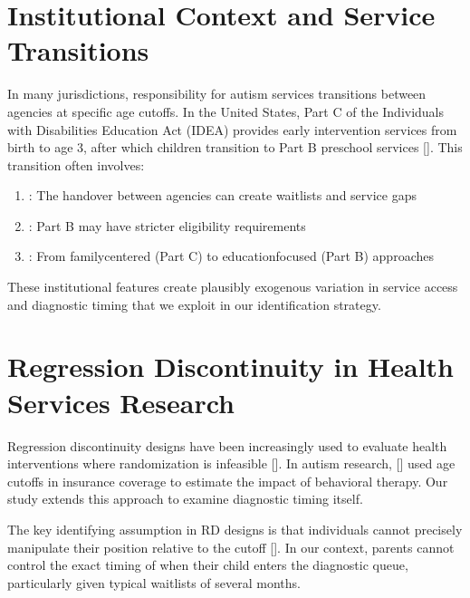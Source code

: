 \documentclass[letterpaper,10pt,english]{jupyterBook}
\begin{document}
\section{Institutional Context and Service Transitions}
\label{\detokenize{literature_review:institutional-context-and-service-transitions}}
\sphinxAtStartPar
In many jurisdictions, responsibility for autism services transitions between agencies at specific age cutoffs. In the United States, Part C of the Individuals with Disabilities Education Act (IDEA) provides early intervention services from birth to age 3, after which children transition to Part B preschool services {[}{]}. This transition often involves:
\begin{enumerate}
%
\item {} 
\sphinxAtStartPar
{}: The handover between agencies can create waitlists and service gaps

\item {} 
\sphinxAtStartPar
{}: Part B may have stricter eligibility requirements

\item {} 
\sphinxAtStartPar
{}: From family\sphinxhyphen{}centered (Part C) to education\sphinxhyphen{}focused (Part B) approaches

\end{enumerate}

\sphinxAtStartPar
These institutional features create plausibly exogenous variation in service access and diagnostic timing that we exploit in our identification strategy.


\section{Regression Discontinuity in Health Services Research}
\label{\detokenize{literature_review:regression-discontinuity-in-health-services-research}}
\sphinxAtStartPar
Regression discontinuity designs have been increasingly used to evaluate health interventions where randomization is infeasible {[}{]}. In autism research, {[}{]} used age cutoffs in insurance coverage to estimate the impact of behavioral therapy. Our study extends this approach to examine diagnostic timing itself.

\sphinxAtStartPar
The key identifying assumption in RD designs is that individuals cannot precisely manipulate their position relative to the cutoff {[}{]}. In our context, parents cannot control the exact timing of when their child enters the diagnostic queue, particularly given typical waitlists of several months.
\end{document}
